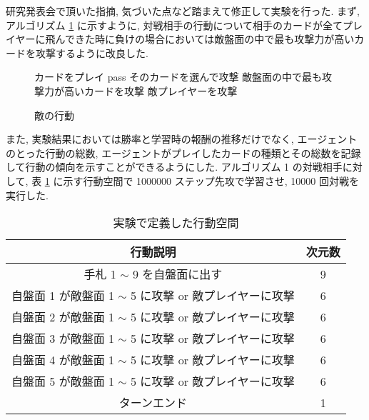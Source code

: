 \documentclass{jarticle}     %
\begin{document}
研究発表会で頂いた指摘, 気づいた点など踏まえて修正して実験を行った. 
まず, アルゴリズム \ref{alg1} に示すように, 対戦相手の行動について相手のカードが全てプレイヤーに飛んできた時に負けの場合においては敵盤面の中で最も攻撃力が高いカードを攻撃するように改良した.
\begin{figure}[ht]
  \begin{algorithm}[H]
      \caption{敵の行動}
      \label{alg1}
      \begin{algorithmic}[1] 
      \STATE カードをプレイ
      \ELSE
      \STATE pass
      \ENDIF
      \ENDFOR
      \STATE そのカードを選んで攻撃
      \ELSE
      \STATE 敵盤面の中で最も攻撃力が高いカードを攻撃
      \ELSE
      \STATE 敵プレイヤーを攻撃
      \ENDIF
      \ENDIF
      \ENDFOR
      \end{algorithmic}
  \end{algorithm}
\end{figure}
また, 実験結果においては勝率と学習時の報酬の推移だけでなく, エージェントのとった行動の総数, エージェントがプレイしたカードの種類とその総数を記録して行動の傾向を示すことができるようにした. 
アルゴリズム 1 の対戦相手に対して, 表 \ref{table:action2-2} に示す行動空間で 1000000 ステップ先攻で学習させ, 10000 回対戦を実行した.
\begin{table}[h]
  \centering
  \caption{実験で定義した行動空間}
  \label{table:action2-2}
  \begin{tabular}{|c|c|}
  \hline
  行動説明                          & 次元数        \\ \hline
  手札 1 $\sim$ 9 を自盤面に出す             & 9          \\ \hline
  自盤面 1 が敵盤面 1 $\sim$ 5 に攻撃 or 敵プレイヤーに攻撃    & 6          \\ \hline
  自盤面 2 が敵盤面 1 $\sim$ 5 に攻撃 or 敵プレイヤーに攻撃    & 6   \\ \hline
  自盤面 3 が敵盤面 1 $\sim$ 5 に攻撃 or 敵プレイヤーに攻撃    & 6\\ \hline
  自盤面 4 が敵盤面 1 $\sim$ 5 に攻撃 or 敵プレイヤーに攻撃    & 6 \\ \hline
  自盤面 5 が敵盤面 1 $\sim$ 5 に攻撃 or 敵プレイヤーに攻撃    & 6\\ \hline
  ターンエンド & 1 \\ \hline
  \end{tabular}
  \end{table}
\end{document}
